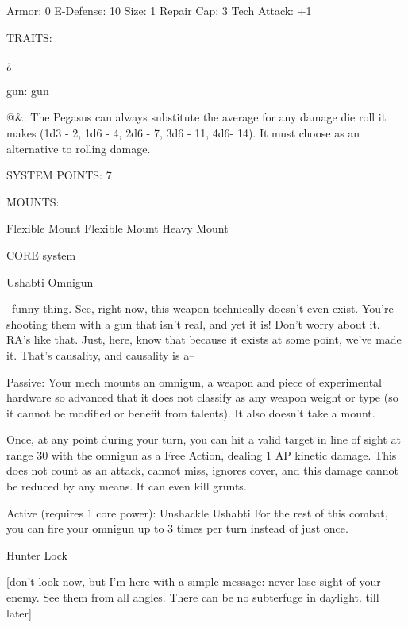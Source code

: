   Armor: 0        E-Defense: 10                           Size: 1             Repair Cap: 3       Tech Attack:  
                                                                                                  +1 

                                                      TRAITS: 

  ¿%
 
  gun: gun
 
  @\&: The Pegasus can always substitute the average for any damage die roll it makes  (1d3 - 2, 1d6 - 4,  
  2d6 - 7, 3d6 - 11, 4d6- 14). It must choose as an alternative to rolling damage. 

                                                SYSTEM POINTS: 7 

                                                     MOUNTS: 

  Flexible Mount                      Flexible Mount                          Heavy Mount 

                                                   CORE system 

                                                 Ushabti Omnigun  

   --funny thing. See, right now, this weapon technically doesn’t even exist. You’re shooting them with a  
  gun that isn’t real, and yet it is! Don’t worry about it.  RA’s like that. Just, here, know that because it  
  exists at some point, we’ve made it. That’s causality, and causality is a--  

  Passive: Your mech mounts an omnigun, a weapon and piece of experimental hardware so advanced  
  that it does not classify as any weapon weight or type (so it cannot be modified or benefit from talents).  
  It also doesn’t take a mount.
 
  Once, at any point during your turn, you can hit a valid target in line of sight at range 30 with the  
  omnigun as a Free Action, dealing 1 AP kinetic damage. This does not count as an attack, cannot miss,  
  ignores cover, and this damage cannot be reduced by any means. It can even kill grunts.
 
  Active (requires 1 core power): Unshackle Ushabti  
  For the rest of this combat, you can fire your omnigun up to 3 times per turn instead of just once. 

Hunter Lock  

[don’t look now, but I’m here with a simple message: never lose sight of your enemy. See them from all  
angles. There can be no subterfuge in daylight. till later]
 

